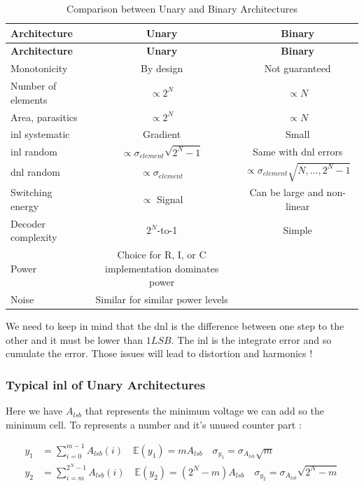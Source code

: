 \documentclass[
  a4paper,
]{article}
\begin{document}
\hypertarget{tab:unary_vs_binary}{}
\begin{longtable}[]{@{}lcc@{}}
\caption{Comparison between Unary and Binary
Architectures}\tabularnewline
\toprule\noalign{}
\textbf{Architecture} & \textbf{Unary} & \textbf{Binary} \\
\midrule\noalign{}
\endfirsthead
\toprule\noalign{}
\textbf{Architecture} & \textbf{Unary} & \textbf{Binary} \\
\midrule\noalign{}
\endhead
\bottomrule\noalign{}
\endlastfoot
Monotonicity & By design & Not guaranteed \\
Number of elements & \(\propto 2^N\) & \(\propto N\) \\
Area, parasitics & \(\propto 2^N\) & \(\propto N\) \\
{inl} systematic & Gradient & Small \\
{inl} random & \(\propto \sigma_{element} \sqrt{2^N-1}\) & Same with
{dnl} errors \\
{dnl} random & \(\propto \sigma_{element}\) &
\(\propto \sigma_{element} \sqrt{N, \dots, 2^N-1}\) \\
Switching energy & \(\propto\) Signal & Can be large and non-linear \\
Decoder complexity & \(2^N\)-to-1 & Simple \\
Power & Choice for R, I, or C implementation dominates power & \\
Noise & Similar for similar power levels & \\
\end{longtable}

We need to keep in mind that the {dnl} is the difference between one
step to the other and it must be lower than \(1 LSB\). The {inl} is the
integrate error and so cumulate the error. Those issues will lead to
distortion and harmonics !

\hypertarget{typical-inl-of-unary-architectures}{%
\subsubsection{\texorpdfstring{Typical {inl} of Unary
Architectures}{Typical inl of Unary Architectures}}\label{typical-inl-of-unary-architectures}}

Here we have \(A_{lsb}\) that represents the minimum voltage we can add
so the minimum cell. To represents a number and it's unused counter part
:

\[\begin{aligned}
    y_1 &= \sum_{i=0}^{m-1} A_{lsb}(i) \quad \mathbb{E}(y_1) = m A_{lsb} \quad \sigma_{y_1} = \sigma_{A_{lsb}} \sqrt{m}\\
    y_2 &= \sum_{i=m}^{2^N-1} A_{lsb}(i) \quad \mathbb{E}(y_2) = (2^N-m) A_{lsb} \quad \sigma_{y_2} = \sigma_{A_{lsb}} \sqrt{2^N -m}
\end{aligned}\]
\end{document}
